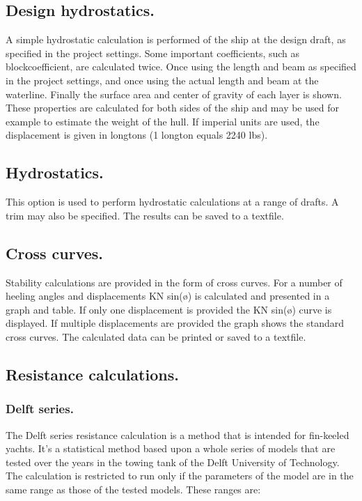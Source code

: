 \documentclass[12pt]{article}
\begin{document}
\subsection{Design hydrostatics.}
A simple hydrostatic calculation is performed of the ship at the design draft, as specified in the
project settings. Some important coefficients, such as blockcoefficient, are calculated twice. Once
using the length and beam as specified in the project settings, and once using the actual length and
beam at the waterline. Finally the surface area and center of gravity of each layer is shown. These
properties are calculated for both sides of the ship and may be used for example to estimate the
weight of the hull.
If imperial units are used, the displacement is given in longtons (1 longton equals 2240 lbs).

\subsection{Hydrostatics.}
This option is used to perform hydrostatic calculations at a range of drafts. A trim may also be
specified. The results can be saved to a textfile.

\subsection{Cross curves.}
Stability calculations are provided in the form of cross curves. For a number of heeling angles and
displacements KN sin(ø) is calculated and presented in a graph and table. If only one displacement
is provided the KN sin(ø) curve is displayed. If multiple displacements are provided the graph shows
the standard cross curves. The calculated data can be printed or saved to a textfile.

\subsection{Resistance calculations.}

\subsubsection{Delft series.}
The Delft series resistance calculation is a
method that is intended for fin-keeled
yachts. It's a statistical method based upon
a whole series of models that are tested
over the years in the towing tank of the
Delft University of Technology. The
calculation is restricted to run only if the
parameters of the model are in the same
range as those of the tested models.
These ranges are:
\end{document}
